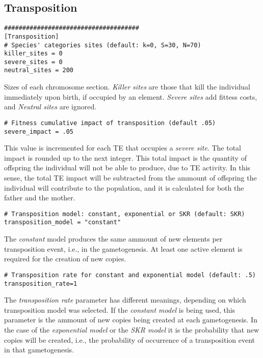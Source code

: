 \documentclass[10pt]{article}
\begin{document}
\subsection{Transposition}
\label{sec:default_config_transposition}

\begin{verbatim}
#####################################
[Transposition]
# Species' categories sites (default: k=0, S=30, N=70)
killer_sites = 0
severe_sites = 0
neutral_sites = 200
\end{verbatim}

Sizes of each chromosome section. {\em Killer sites} are those that
kill the individual immediately upon birth, if occupied by an
element. {\em Severe sites} add fittess costs, and {\em Neutral sites}
are ignored.

\begin{verbatim}
# Fitness cumulative impact of transposition (default .05)
severe_impact = .05
\end{verbatim}

This value is incremented for each TE that occupies a {\em severe
  site}. The total impact is rounded up to the next integer. This
total impact is the quantity of offspring the individual will not be
able to produce, due to TE activity. In this sense, the total TE
impact will be subtracted from the ammount of offspring the individual
will contribute to the population, and it is calculated for both the
father and the mother.

\begin{verbatim}
# Transposition model: constant, exponential or SKR (default: SKR)
transposition_model = "constant"
\end{verbatim}

The {\em constant} model produces the same ammount of new elements per
transposition event, i.e., in the gametogenesis. At least one active
element is required for the creation of new copies.

\begin{verbatim}
# Transposition rate for constant and exponential model (default: .5)
transposition_rate=1
\end{verbatim}

The {\em transposition rate} parameter has different meanings,
depending on which transposition model was selected. If the {\em
  constant model} is being used, this parameter is the ammount of new
copies being created at each gametogenesis. In the case of the {\em
  exponential model} or the {\em SKR model} it is the probability that
new copies will be created, i.e., the probability of occurrence of a
transposition event in that gametogenesis.
\end{document}
